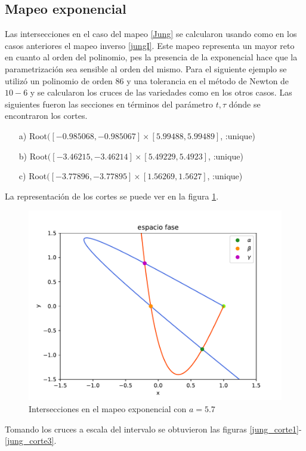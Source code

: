 \subsection{Mapeo exponencial}
Las intersecciones en el caso del mapeo \ref{Jung} se calcularon usando como en los casos anteriores el mapeo inverso \ref{jungI}. Este mapeo representa un mayor reto en cuanto al orden del polinomio, pes la presencia de la exponencial hace que la parametrización sea sensible al orden del mismo. Para el siguiente ejemplo se utilizó un polinomio de orden 86 y una tolerancia en el método de Newton de $10-6$ y se calcularon los cruces de las variedades como en los otros casos. Las siguientes fueron las secciones en términos del parámetro $t,\tau$ dónde se encontraron los cortes. 
\begin{itemize}
\item[a)] Root$([-0.985068, -0.985067] \times [5.99488, 5.99489]$, :unique)
\item[b)] Root$([-3.46215, -3.46214] \times [5.49229, 5.4923]$, :unique)
\item[c)] Root$([-3.77896, -3.77895] \times [1.56269, 1.5627]$, :unique)
\end{itemize}
La representación de los cortes se puede ver en la figura \ref{jung_cortes}.
\begin{figure}[H]
\centering
\includegraphics[scale=0.5]{cruces_jung1}
\caption{Intersecciones en el mapeo exponencial con $a=5.7$}
\label{jung_cortes}
\end{figure}

Tomando los cruces a escala del intervalo se obtuvieron las figuras \ref{jung_corte1}-\ref{jung_corte3}.


